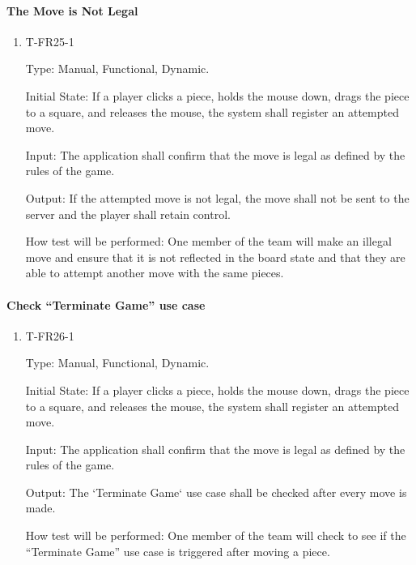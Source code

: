 \documentclass[12pt, titlepage]{article}
\begin{document}
    \paragraph{The Move is Not Legal}

        \begin{enumerate}

        \item{T-FR25-1\\}

            Type: Manual, Functional, Dynamic.
            					
            Initial State: If a player clicks a piece, holds the mouse down, drags the piece to a square, and releases the mouse, the system shall register an attempted move.
            					
            Input: The application shall confirm that the move is legal as defined by the rules of the game.
            					
            Output: If the attempted move is not legal, the move shall not be sent to the server and the player shall retain control.

            How test will be performed: One member of the team will make an illegal move and ensure that it is not reflected in the board state and that they are able to attempt another move with the same pieces.

        \end{enumerate}

    \paragraph{Check ``Terminate Game'' use case}

        \begin{enumerate}

        \item{T-FR26-1\\}

            Type: Manual, Functional, Dynamic.
            					
            Initial State: If a player clicks a piece, holds the mouse down, drags the piece to a square, and releases the mouse, the system shall register an attempted move.
            					
            Input: The application shall confirm that the move is legal as defined by the rules of the game.
            					
            Output: The ‘Terminate Game‘ use case shall be checked after every move is made.

            How test will be performed: One member of the team will check to see if the ``Terminate Game'' use case is triggered after moving a piece.

        \end{enumerate}
\end{document}
